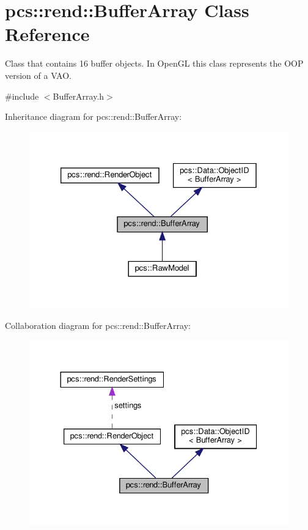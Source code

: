 \hypertarget{classpcs_1_1rend_1_1BufferArray}{}\section{pcs\+:\+:rend\+:\+:Buffer\+Array Class Reference}
\label{classpcs_1_1rend_1_1BufferArray}


Class that contains 16 buffer objects. In Open\+GL this class represents the O\+OP version of a V\+AO.  




{\ttfamily \#include $<$Buffer\+Array.\+h$>$}



Inheritance diagram for pcs\+:\+:rend\+:\+:Buffer\+Array\+:\nopagebreak
\begin{figure}[H]
\begin{center}
\leavevmode
\includegraphics[width=326pt]{classpcs_1_1rend_1_1BufferArray__inherit__graph}
\end{center}
\end{figure}


Collaboration diagram for pcs\+:\+:rend\+:\+:Buffer\+Array\+:\nopagebreak
\begin{figure}[H]
\begin{center}
\leavevmode
\includegraphics[width=330pt]{classpcs_1_1rend_1_1BufferArray__coll__graph}
\end{center}
\end{figure}
